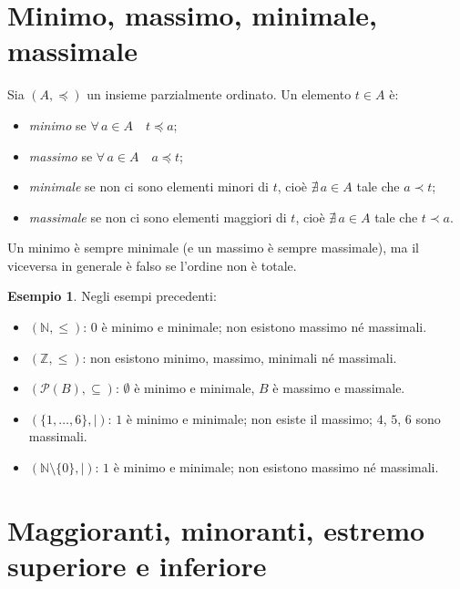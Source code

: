 \documentclass[11pt,a4paper]{article}
\theoremstyle{definition}
\newtheorem*{esempio}{Esempio}
\begin{document}
\section{Minimo, massimo, minimale, massimale}

\begin{definizione}
Sia $(A, \preceq)$ un insieme parzialmente ordinato. Un elemento $t \in A$ è:
\begin{itemize}
    \item \emph{minimo} se $\forall\, a \in A \quad t \preceq a$;
    \item \emph{massimo} se $\forall\, a \in A \quad a \preceq t$;
    \item \emph{minimale} se non ci sono elementi minori di $t$, cioè
          $\nexists\, a \in A$ tale che $a \prec t$;
    \item \emph{massimale} se non ci sono elementi maggiori di $t$, cioè
          $\nexists\, a \in A$ tale che $t \prec a$.
\end{itemize}
\end{definizione}

Un minimo è sempre minimale (e un massimo è sempre massimale), ma il
viceversa in generale è falso se l'ordine non è totale.

\begin{esempio}
Negli esempi precedenti:
\begin{itemize}
    \item $(\mathbb{N}, \leq)$: $0$ è minimo e minimale; non esistono
          massimo né massimali.
    \item $(\mathbb{Z}, \leq)$: non esistono minimo, massimo, minimali né
          massimali.
    \item $(\mathcal{P}(B), \subseteq)$: $\emptyset$ è minimo e minimale,
          $B$ è massimo e massimale.
    \item $(\{1, \dots, 6\}, \mid)$: $1$ è minimo e minimale; non esiste
          il massimo; $4$, $5$, $6$ sono massimali.
    \item $(\mathbb{N} \setminus \{0\}, \mid)$: $1$ è minimo e minimale;
          non esistono massimo né massimali.
\end{itemize}
\end{esempio}

\section{Maggioranti, minoranti, estremo superiore e inferiore}
\end{document}
